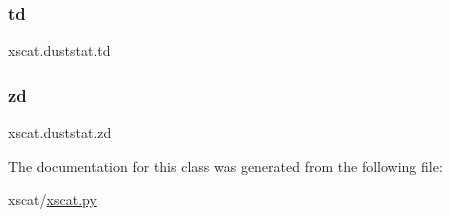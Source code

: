 \mbox{\label{classxscat_1_1duststat_abbaecc521acf76189ea5248e78c5c5bb}} 
\subsubsection{\texorpdfstring{td}{td}}
{\footnotesize\ttfamily xscat.\+duststat.\+td}

\mbox{\label{classxscat_1_1duststat_a0a7849280f4e35de134ff34f829df531}} 
\subsubsection{\texorpdfstring{zd}{zd}}
{\footnotesize\ttfamily xscat.\+duststat.\+zd}



The documentation for this class was generated from the following file\+:\begin{DoxyCompactItemize}
\item 
xscat/\hyperlink{xscat_8py}{xscat.\+py}\end{DoxyCompactItemize}
